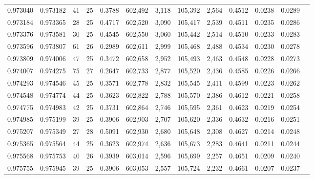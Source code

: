 \begin{tabular}{rrrrrrrrrrrrr}
0.973040 & 0.973182 &    41 &  25 &                                     0.3788 & 602,492 &   3,118 & 105,392 &   2,564 & 0.4512 & 0.0238 & 0.0289 \\
0.973184 & 0.973365 &    28 &  25 &                                     0.4717 & 602,520 &   3,090 & 105,417 &   2,539 & 0.4511 & 0.0235 & 0.0286 \\
0.973376 & 0.973581 &    30 &  25 &                                     0.4545 & 602,550 &   3,060 & 105,442 &   2,514 & 0.4510 & 0.0233 & 0.0283 \\
0.973596 & 0.973807 &    61 &  26 &                                     0.2989 & 602,611 &   2,999 & 105,468 &   2,488 & 0.4534 & 0.0230 & 0.0278 \\
0.973809 & 0.974006 &    47 &  25 &                                     0.3472 & 602,658 &   2,952 & 105,493 &   2,463 & 0.4548 & 0.0228 & 0.0273 \\
0.974007 & 0.974275 &    75 &  27 &                                     0.2647 & 602,733 &   2,877 & 105,520 &   2,436 & 0.4585 & 0.0226 & 0.0266 \\
0.974293 & 0.974546 &    45 &  25 &                                     0.3571 & 602,778 &   2,832 & 105,545 &   2,411 & 0.4599 & 0.0223 & 0.0262 \\
0.974548 & 0.974774 &    44 &  25 &                                     0.3623 & 602,822 &   2,788 & 105,570 &   2,386 & 0.4612 & 0.0221 & 0.0258 \\
0.974775 & 0.974983 &    42 &  25 &                                     0.3731 & 602,864 &   2,746 & 105,595 &   2,361 & 0.4623 & 0.0219 & 0.0254 \\
0.974985 & 0.975199 &    39 &  25 &                                     0.3906 & 602,903 &   2,707 & 105,620 &   2,336 & 0.4632 & 0.0216 & 0.0251 \\
0.975207 & 0.975349 &    27 &  28 &                                     0.5091 & 602,930 &   2,680 & 105,648 &   2,308 & 0.4627 & 0.0214 & 0.0248 \\
0.975365 & 0.975564 &    44 &  25 &                                     0.3623 & 602,974 &   2,636 & 105,673 &   2,283 & 0.4641 & 0.0211 & 0.0244 \\
0.975568 & 0.975753 &    40 &  26 &                                     0.3939 & 603,014 &   2,596 & 105,699 &   2,257 & 0.4651 & 0.0209 & 0.0240 \\
0.975755 & 0.975945 &    39 &  25 &                                     0.3906 & 603,053 &   2,557 & 105,724 &   2,232 & 0.4661 & 0.0207 & 0.0237 \\

\end{tabular}
